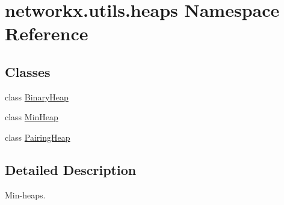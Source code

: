 \hypertarget{namespacenetworkx_1_1utils_1_1heaps}{}\section{networkx.\+utils.\+heaps Namespace Reference}
\label{namespacenetworkx_1_1utils_1_1heaps}
\subsection*{Classes}
\begin{DoxyCompactItemize}
\item 
class \hyperlink{classnetworkx_1_1utils_1_1heaps_1_1BinaryHeap}{Binary\+Heap}
\item 
class \hyperlink{classnetworkx_1_1utils_1_1heaps_1_1MinHeap}{Min\+Heap}
\item 
class \hyperlink{classnetworkx_1_1utils_1_1heaps_1_1PairingHeap}{Pairing\+Heap}
\end{DoxyCompactItemize}


\subsection{Detailed Description}
\begin{DoxyVerb}Min-heaps.
\end{DoxyVerb}
 